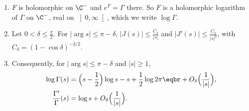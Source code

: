 \begin{theorem}\label{thm:stirlingc}
\begin{enumerate}[label=(\alph*)]
\item $F$ is holomorphic on $\C^-$ and $e^{F}=\Gamma$ there. So $F$ is a holomorphic logarithm of $\Gamma$ on $\C^-$, real on $\left]0,\infty\right[$, which we write $\log\Gamma$.
\item Let $0<\delta\le\frac\pi2$. For $|\arg s|\le\pi-\delta$, $|J(s)|\le\frac{C_\delta}{|s|}$ and $|J'(s)|\le\frac{C_\delta}{|s|^2}$, with $C_\delta=(1-\cos\delta)^{-3/2}$.
\item Consequently, for $|\arg s|\le\pi-\delta$ and $|s|\ge1$,
\[
\begin{aligned}\log\Gamma(s)&=\Bigl(s-\frac12\Bigr)\log s-s+\frac12\log2\pi\eqbr+O_\delta\Bigl(\frac1{|s|}\Bigr),\\\frac{\Gamma'}\Gamma(s)&=\log s+O_\delta\Bigl(\frac1{|s|}\Bigr).\end{aligned}
\]
\end{enumerate}
\end{theorem}
